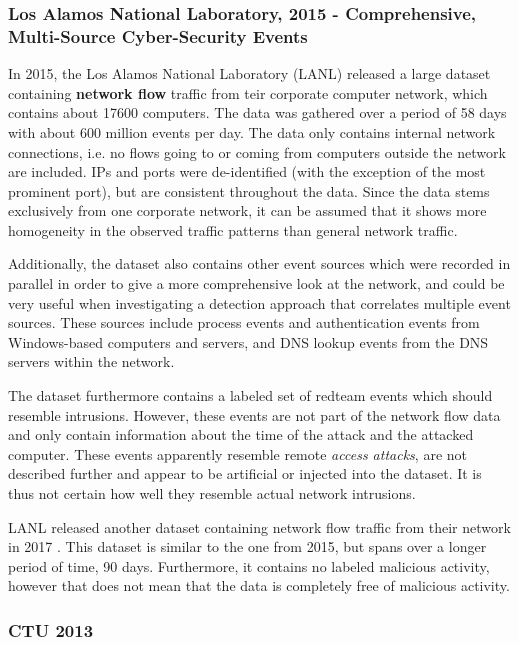 \documentclass[a4paper,12pt,twoside]{report}
\begin{document}
\subsubsection*{Los Alamos National Laboratory, 2015 - Comprehensive, Multi-Source Cyber-Security Events \cite{akent-2015-enterprise-data}\cite{kent-2015-cyberdata1}}

In 2015, the Los Alamos National Laboratory (LANL) released a large dataset containing \textbf{network flow} traffic from teir corporate computer network, which contains about 17600 computers. The data was gathered over a period of 58 days with about 600 million events per day. The data only contains internal network connections, i.e. no flows going to or coming from computers outside the network are included. IPs and ports were de-identified (with the exception of the most prominent port), but are consistent throughout the data. Since the data stems exclusively from one corporate network, it can be assumed that it shows more homogeneity in the observed traffic patterns than  general network traffic.

Additionally, the dataset also contains other event sources which were recorded in parallel in order to give a more comprehensive look at the network, and could be very useful when investigating a detection approach that correlates multiple event sources. These sources include process events and authentication events from Windows-based computers and servers, and DNS lookup events from the DNS servers within the network. 

The dataset furthermore contains a labeled set of redteam events which should resemble intrusions. However, these events are not part of the network flow data and only contain information about the time of the attack and the attacked computer. These events apparently resemble remote \textit{access attacks}, are not described further and appear to be artificial or injected into the dataset. It is thus not certain how well they resemble actual network intrusions.


LANL released another dataset containing network flow traffic from their network in 2017 \cite{turcotte17}. This dataset is similar to the one from 2015, but spans over a longer period of time, 90 days. Furthermore, it contains no labeled malicious activity,  however that does not mean that the data is completely free of malicious activity.

\subsubsection*{CTU 2013 \cite{noauthor_ctu-13_nodate, garcia2014empirical}}
\end{document}
